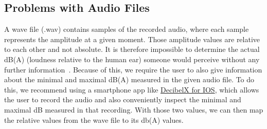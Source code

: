 \subsection{Problems with Audio Files}\label{subsec:problems-with-audio-files}
A wave file (.wav) contains samples of the recorded audio, where each sample represents the amplitude at a given moment.
Those amplitude values are relative to each other and not absolute.
It is therefore impossible to determine the actual dB(A) (loudness relative to the human ear) someone would perceive without any further information~\cite{adobe_community_how_to_know_the_real_world_db_level_of_a_file,stackoverflow_how_can_i_calculate_audio_db_level,stackexchange_exteracting_sound_pressure_from_wav_file}.
Because of this, we require the user to also give information about the minimal and maximal dB(A) measured in the given audio file.
To do this, we recommend using a smartphone app like \href{https://apps.apple.com/ch/app/dezibel-x-dba-l\%C3\%A4rm-messger\%C3\%A4t/id448155923}{DecibelX for IOS},
which allows the user to record the audio and also conveniently inspect the minimal and maximal dB measured in that recording.
With those two values, we can then map the relative values from the wave file to its db(A) values.
